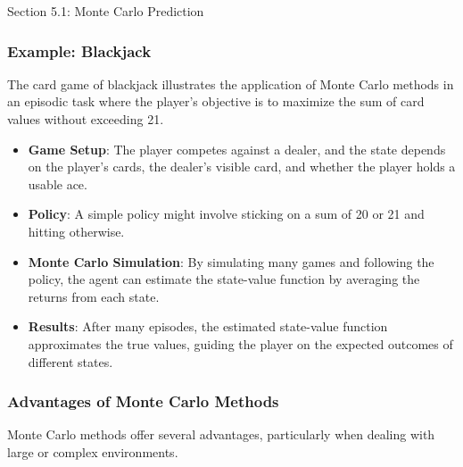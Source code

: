 \begin{notes}{Section 5.1: Monte Carlo Prediction}
\begin{highlight}
    \end{highlight}
    
    \subsubsection*{Example: Blackjack}
    
    The card game of blackjack illustrates the application of Monte Carlo methods in an episodic task where the player's objective is to maximize the sum of card values without exceeding 21.
    
    \begin{highlight}
    
        \begin{itemize}
            \item \textbf{Game Setup}: The player competes against a dealer, and the state depends on the player's cards, the dealer's visible card, and whether the player holds a usable ace.
            \item \textbf{Policy}: A simple policy might involve sticking on a sum of 20 or 21 and hitting otherwise.
            \item \textbf{Monte Carlo Simulation}: By simulating many games and following the policy, the agent can estimate the state-value function by averaging the returns from each state.
            \item \textbf{Results}: After many episodes, the estimated state-value function approximates the true values, guiding the player on the expected outcomes of different states.
        \end{itemize}
    
    \end{highlight}
    
    \subsubsection*{Advantages of Monte Carlo Methods}
    
    Monte Carlo methods offer several advantages, particularly when dealing with large or complex environments.
    
    \begin{highlight}
    

\end{highlight}
\end{notes}
